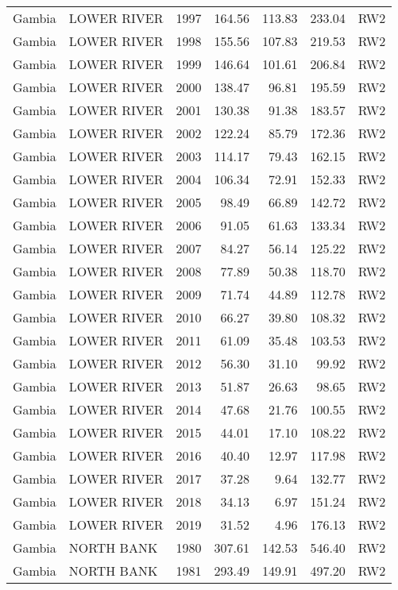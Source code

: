 \begin{longtable}{lllrrrl}
  Gambia & LOWER RIVER & 1997 & 164.56 & 113.83 & 233.04 & RW2 \\ 
  Gambia & LOWER RIVER & 1998 & 155.56 & 107.83 & 219.53 & RW2 \\ 
  Gambia & LOWER RIVER & 1999 & 146.64 & 101.61 & 206.84 & RW2 \\ 
  Gambia & LOWER RIVER & 2000 & 138.47 & 96.81 & 195.59 & RW2 \\ 
  Gambia & LOWER RIVER & 2001 & 130.38 & 91.38 & 183.57 & RW2 \\ 
  Gambia & LOWER RIVER & 2002 & 122.24 & 85.79 & 172.36 & RW2 \\ 
  Gambia & LOWER RIVER & 2003 & 114.17 & 79.43 & 162.15 & RW2 \\ 
  Gambia & LOWER RIVER & 2004 & 106.34 & 72.91 & 152.33 & RW2 \\ 
  Gambia & LOWER RIVER & 2005 & 98.49 & 66.89 & 142.72 & RW2 \\ 
  Gambia & LOWER RIVER & 2006 & 91.05 & 61.63 & 133.34 & RW2 \\ 
  Gambia & LOWER RIVER & 2007 & 84.27 & 56.14 & 125.22 & RW2 \\ 
  Gambia & LOWER RIVER & 2008 & 77.89 & 50.38 & 118.70 & RW2 \\ 
  Gambia & LOWER RIVER & 2009 & 71.74 & 44.89 & 112.78 & RW2 \\ 
  Gambia & LOWER RIVER & 2010 & 66.27 & 39.80 & 108.32 & RW2 \\ 
  Gambia & LOWER RIVER & 2011 & 61.09 & 35.48 & 103.53 & RW2 \\ 
  Gambia & LOWER RIVER & 2012 & 56.30 & 31.10 & 99.92 & RW2 \\ 
  Gambia & LOWER RIVER & 2013 & 51.87 & 26.63 & 98.65 & RW2 \\ 
  Gambia & LOWER RIVER & 2014 & 47.68 & 21.76 & 100.55 & RW2 \\ 
  Gambia & LOWER RIVER & 2015 & 44.01 & 17.10 & 108.22 & RW2 \\ 
  Gambia & LOWER RIVER & 2016 & 40.40 & 12.97 & 117.98 & RW2 \\ 
  Gambia & LOWER RIVER & 2017 & 37.28 & 9.64 & 132.77 & RW2 \\ 
  Gambia & LOWER RIVER & 2018 & 34.13 & 6.97 & 151.24 & RW2 \\ 
  Gambia & LOWER RIVER & 2019 & 31.52 & 4.96 & 176.13 & RW2 \\ 
  Gambia & NORTH BANK & 1980 & 307.61 & 142.53 & 546.40 & RW2 \\ 
  Gambia & NORTH BANK & 1981 & 293.49 & 149.91 & 497.20 & RW2 \\ 

\end{longtable}
